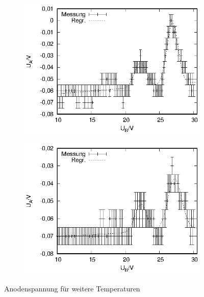 \begin{figure}[!h]
\begin{subfigure}[h]{0.5\textwidth}
    \includegraphics{data/fh/175K4V.eps}
  \end{subfigure}%
  \begin{subfigure}[h]{0.5\textwidth}
    \centering
    \includegraphics{data/fh/181K4V.eps}
  \end{subfigure}
  \caption{Anodenspannung für weitere Temperaturen}
  \label{fig:kennlinien1}
\end{figure}

\newpage

